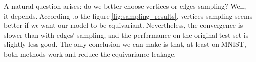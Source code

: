 \documentclass{article}
\begin{document}
A natural question arises: do we better choose vertices or edges sampling? Well, it depends. According to the figure \ref{fig:sampling_results}, vertices sampling seems better if we want our model to be equivariant. Nevertheless, the convergence is slower than with edges' sampling, and the performance on the original test set is slightly less good. The only conclusion we can make is that, at least on MNIST, both methods work and reduce the equivariance leakage.

\end{document}
